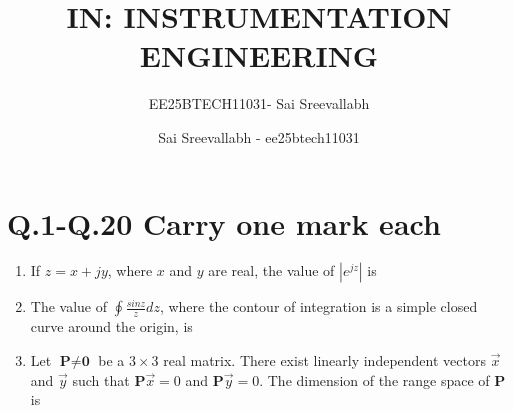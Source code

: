 \documentclass[journal,12pt,onecolumn]{IEEEtran}
\title{IN: INSTRUMENTATION ENGINEERING}
\author{EE25BTECH11031- Sai Sreevallabh}
\author{Sai Sreevallabh - ee25btech11031}
\theoremstyle{remark}
\begin{document}
\maketitle

\section*{\textbf{Q.1-Q.20 Carry one mark each}} 

\begin{enumerate}
\item If $z=x+jy$, where $x$ and $y$ are real, the value of $|e^{jz}|$ is \par \hfill{}
    \begin{enumerate}
\end{enumerate}

\item The value of $\oint\frac{sinz}{z}dz$, where the contour of integration is a simple closed curve around the origin, is \par \hfill{} 
\begin{enumerate}
\end{enumerate}

\item Let  $\textbf{P} \not= \textbf{0}$ be a $3 \times 3$ real matrix. There exist linearly independent vectors $\Vec{x}$ and $\Vec{y}$ such that $\textbf{P}\vec{x} = 0$ and $\textbf{P}\vec{y} = 0$. The dimension of the range space of \textbf{P} is \par \hfill{}
\begin{enumerate}
\end{enumerate}


\end{enumerate}
\end{document}
